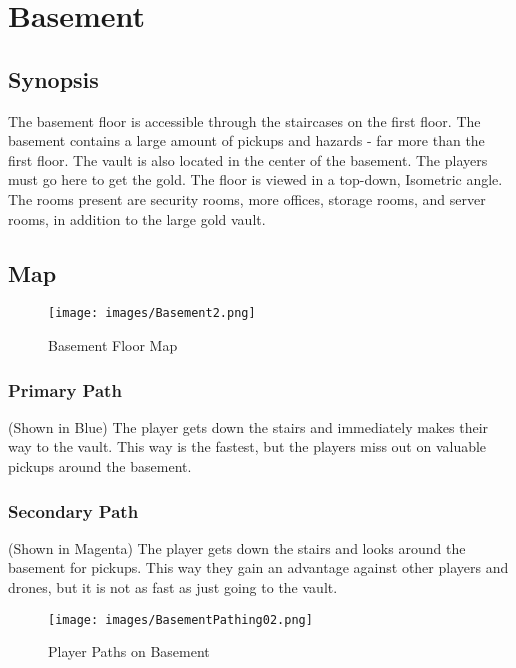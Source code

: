 \documentclass[10pt]{report}
\begin{document}
\section{Basement}

\subsection{Synopsis}

The basement floor is accessible through the staircases on the first floor. The basement contains a large amount of pickups and hazards - far more than the first floor. The vault is also located in the center of the basement. The players must go here to get the gold. The floor is viewed in a top-down, Isometric angle. The rooms present are security rooms, more offices, storage rooms, and server rooms, in addition to the large gold vault.

\subsection{Map}

\begin{figure}[H]
    \centering
    \texttt{[image: images/Basement2.png]}
    \caption{Basement Floor Map}
\end{figure}

\subsubsection{Primary Path}

(Shown in Blue) The player gets down the stairs and immediately makes their way to the vault. This way is the fastest, but the players miss out on valuable pickups around the basement.

\subsubsection{Secondary Path}

(Shown in Magenta) The player gets down the stairs and looks around the basement for pickups. This way they gain an advantage against other players and drones, but it is not as fast as just going to the vault.

\begin{figure}[H]
    \centering
    \texttt{[image: images/BasementPathing02.png]}
    \caption{Player Paths on Basement}
\end{figure}
\end{document}
